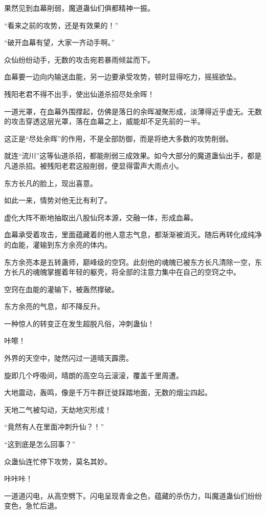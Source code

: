 \begin{this_body}
果然见到血幕削弱，魔道蛊仙们俱都精神一振。

“看来之前的攻势，还是有效果的！”

“破开血幕有望，大家一齐动手啊。”

众仙纷纷动手，无数的攻击宛若暴雨倾盆而下。

血幕要一边向内输送血能，另一边要承受攻势，顿时显得吃力，摇摇欲坠。

残阳老君不得不出手，使出仙道杀招尽处余晖！

一道光罩，在血幕外围撑起，仿佛是落日的余晖凝聚形成，淡薄得近乎虚无。无数的攻击穿透这层光罩，落在血幕之上，威能却不足先前的一半。

这正是“尽处余晖”的作用，不是全部防御，而是将绝大多数的攻势削弱。

就连“流川”这等仙道杀招，都能削弱三成效果。如今大部分的魔道蛊仙出手，都是凡道杀招。被残阳老君这般削弱，便显得雷声大雨点小。

东方长凡的脸上，现出喜意。

如此一来，情势对他无比有利了。

虚化大阵不断地抽取出八股仙窍本源，交融一体，形成血幕。

血幕承受着攻击，里面蕴藏着的他人意志气息，都渐渐被消灭。随后再转化成纯净的血能，灌输到东方余亮的体内。

东方余亮本是五转蛊师，巅峰级的空窍。此刻他的魂魄已被东方长凡清除一空，东方长凡的魂魄掌握着年轻的躯壳，将全部的注意力集中在自己的空窍之中。

空窍在血能的灌输下，被轰然撑破。

东方余亮的气息，却不降反升。

一种惊人的转变正在发生超脱凡俗，冲刺蛊仙！

咔嚓！

外界的天空中，陡然闪过一道晴天霹雳。

旋即几个呼吸间，晴朗的高空乌云滚滚，覆盖千里周遭。

大地震动，轰鸣，像是千万牛群迁徙踩踏地面，无数的烟尘四起。

天地二气被勾动，天劫地灾形成！

“竟然有人在里面冲刺升仙？！”

“这到底是怎么回事？”

众蛊仙连忙停下攻势，莫名其妙。

咔咔咔！

一道道闪电，从高空劈下。闪电呈现青金之色，蕴藏的杀伤力，叫魔道蛊仙们纷纷变色，急忙后退。


\end{this_body}
